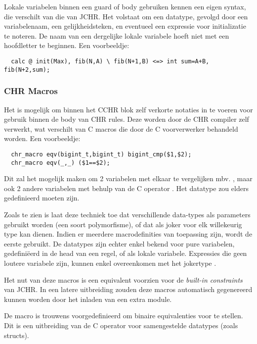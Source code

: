 Lokale variabelen binnen een guard of body gebruiken kennen een eigen syntax, die verschilt van die van JCHR. Het volstaat om een datatype, gevolgd door een variabelenaam, een gelijkheidsteken, en eventueel een expressie voor initializatie te noteren. De naam van een dergelijke lokale variabele hoeft niet met een hoofdletter te beginnen. Een voorbeeldje: \begin{Verbatim}
  calc @ init(Max), fib(N,A) \ fib(N+1,B) <=> int sum=A+B, fib(N+2,sum);
\end{Verbatim}

\subsubsection{CHR Macros}

Het is mogelijk om binnen het CCHR blok zelf verkorte notaties in te voeren voor gebruik binnen de body van CHR rules. Deze worden door de CHR compiler zelf verwerkt, wat verschilt van C macros die door de C voorverwerker behandeld worden. Een voorbeeldje: \begin{Verbatim}
  chr_macro eqv(bigint_t,bigint_t) bigint_cmp($1,$2);
  chr_macro eqv(_,_) ($1==$2);
\end{Verbatim}

Dit zal het mogelijk maken om 2  variabelen met elkaar te vergelijken mbv. , maar ook 2 andere variabelen met behulp van de C operator \code{==}. Het datatype  zou elders gedefinieerd moeten zijn.

Zoals te zien is laat deze techniek toe dat verschillende data-types als parameters gebruikt worden (een soort polymorfisme), of dat \code{\_} als joker voor elk willekeurig type kan dienen. Indien er meerdere macrodefinities van toepassing zijn, wordt de eerste gebruikt. De datatypes zijn echter enkel bekend voor pure variabelen, gedefini\"eerd in de head van een regel, of als lokale variabele. Expressies die geen loutere variabele zijn, kunnen enkel overeenkomen met het jokertype \code{\_}.

Het nut van deze macros is een equivalent voorzien voor de {\em built-in constraints} van JCHR. In een latere uitbreiding zouden deze macros automatisch gegenereerd kunnen worden door het inladen van een extra module.

De macro  is trouwens voorgedefinieerd om binaire equivalenties voor te stellen. Dit is een uitbreiding van de C operator \code{==} voor samengestelde datatypes (zoals structs).

